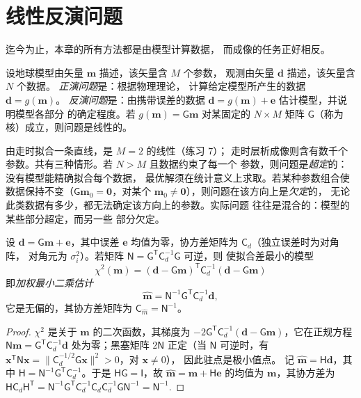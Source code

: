 \section{线性反演问题}\label{sec:b3:seismology-imaging:inverse}

迄今为止，本章的所有方法都是由模型计算数据，
而成像的任务正好相反。

\begin{definition}\label{def:b3:seismology-imaging:inverse}
设地球模型由矢量 $\mathbf m$ 描述，该矢量含 $M$ 个参数，
观测由矢量 $\mathbf d$ 描述，该矢量含 $N$ 个数据。
\emph{正演问题}是：根据物理理论，
计算给定模型所产生的数据 $\mathbf d = g(\mathbf m)$。
\emph{反演问题}是：由携带误差的数据
$\mathbf d = g(\mathbf m) + \mathbf e$ 估计模型，并说明模型各部分
的确定程度。若 $g(\mathbf m) =
\mathsf G\mathbf m$ 对某固定的 $N\times M$ 矩阵 $\mathsf G$（称为核）成立，则问题是线性的。
\end{definition}

由走时拟合一条直线，是 $M = 2$ 的线性（练习 7）；
走时层析成像则含有数千个
参数。共有三种情形。若 $N > M$ 且数据约束了每一个
参数，则问题是\emph{超定}的：没有模型能精确拟合每个数据，
最优解须在统计意义上求取。若某种参数组合使
数据保持不变（$\mathsf G\mathbf m_0 = \mathbf 0$，对某个
$\mathbf m_0 \ne \mathbf 0$），则问题在该方向上是\emph{欠定}的，
无论此类数据有多少，都无法确定该方向上的参数。实际问题
往往是混合的：模型的某些部分超定，而另一些
部分欠定。

\begin{theorem}[加权最小二乘估计]\label{thm:b3:seismology-imaging:wls}
设 $\mathbf d = \mathsf G\mathbf m + \mathbf e$，其中误差 $\mathbf e$
均值为零，协方差矩阵为 $\mathsf C_d$（独立误差时为对角阵，
对角元为 $\sigma_i^2$）。若矩阵
$\mathsf N = \mathsf G^{\mathsf T}\mathsf C_d^{-1}\mathsf G$ 可逆，则
使拟合差最小的模型
\[
  \chi^2(\mathbf m) = (\mathbf d - \mathsf G\mathbf m)^{\mathsf T}\mathsf C_d^{-1}
  (\mathbf d - \mathsf G\mathbf m)
\]
即\emph{加权最小二乘估计}
\[
  \hat{\mathbf m} = \mathsf N^{-1}\mathsf G^{\mathsf T}\mathsf C_d^{-1}\mathbf d ,
\]
它是无偏的，其协方差矩阵为
$\mathsf C_{\hat m} = \mathsf N^{-1}$。
\end{theorem}

\begin{proof}
$\chi^2$ 是关于 $\mathbf m$ 的二次函数，其梯度为
$-2\mathsf G^{\mathsf T}\mathsf C_d^{-1}(\mathbf d - \mathsf G\mathbf m)$，它在正规方程 $\mathsf N\mathbf m = \mathsf G^{\mathsf T}
\mathsf C_d^{-1}\mathbf d$ 处为零；黑塞矩阵 $2\mathsf N$ 正定（当
$\mathsf N$ 可逆时，有 $\mathbf x^{\mathsf T}\mathsf N\mathbf x =
\|\mathsf C_d^{-1/2}\mathsf G\mathbf x\|^2 > 0$，对 $\mathbf x \ne 0$），
因此驻点是极小值点。
记 $\hat{\mathbf m} = \mathsf H\mathbf d$，其中
$\mathsf H = \mathsf N^{-1}\mathsf G^{\mathsf T}\mathsf C_d^{-1}$。于是
$\mathsf H\mathsf G = \mathsf I$，故 $\hat{\mathbf m} = \mathbf m + \mathsf H\mathbf e$
的均值为 $\mathbf m$，其协方差为
$\mathsf H\mathsf C_d\mathsf H^{\mathsf T} =
\mathsf N^{-1}\mathsf G^{\mathsf T}\mathsf C_d^{-1}\mathsf C_d\mathsf C_d^{-1}
\mathsf G\mathsf N^{-1} = \mathsf N^{-1}$.
\end{proof}

